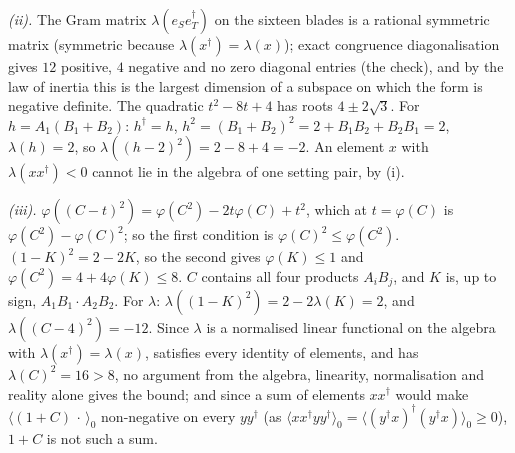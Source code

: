 \emph{(ii).} The Gram matrix $\lambda(e_{S}e_{T}^{\dagger})$ on the sixteen blades is a rational symmetric matrix (symmetric because $\lambda(x^{\dagger}) = \lambda(x)$); exact congruence diagonalisation gives $12$ positive, $4$ negative and no zero diagonal entries (the check), and by the law of inertia this is the largest dimension of a subspace on which the form is negative definite. The quadratic $t^{2} - 8t + 4$ has roots $4 \pm 2\sqrt{3}$. For $h = A_{1}(B_{1} + B_{2})$: $h^{\dagger} = h$, $h^{2} = (B_{1} + B_{2})^{2} = 2 + B_{1}B_{2} + B_{2}B_{1} = 2$, $\lambda(h) = 2$, so $\lambda((h - 2)^{2}) = 2 - 8 + 4 = -2$. An element $x$ with $\lambda(xx^{\dagger}) < 0$ cannot lie in the algebra of one setting pair, by (i).

\emph{(iii).} $\varphi((C - t)^{2}) = \varphi(C^{2}) - 2t\varphi(C) + t^{2}$, which at $t = \varphi(C)$ is $\varphi(C^{2}) - \varphi(C)^{2}$; so the first condition is $\varphi(C)^{2} \le \varphi(C^{2})$. $(1 - K)^{2} = 2 - 2K$, so the second gives $\varphi(K) \le 1$ and $\varphi(C^{2}) = 4 + 4\varphi(K) \le 8$. $C$ contains all four products $A_{i}B_{j}$, and $K$ is, up to sign, $A_{1}B_{1} \cdot A_{2}B_{2}$. For $\lambda$: $\lambda((1 - K)^{2}) = 2 - 2\lambda(K) = 2$, and $\lambda((C - 4)^{2}) = -12$. Since $\lambda$ is a normalised linear functional on the algebra with $\lambda(x^{\dagger}) = \lambda(x)$, satisfies every identity of elements, and has $\lambda(C)^{2} = 16 > 8$, no argument from the algebra, linearity, normalisation and reality alone gives the bound; and since a sum of elements $xx^{\dagger}$ would make $\langle(1 + C)\,\cdot\,\rangle_{0}$ non-negative on every $yy^{\dagger}$ (as $\langle xx^{\dagger}yy^{\dagger}\rangle_{0} = \langle (y^{\dagger}x)^{\dagger}(y^{\dagger}x)\rangle_{0} \ge 0$), $1 + C$ is not such a sum.
